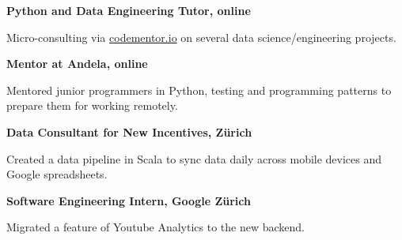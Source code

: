 \documentclass[10pt]{article} %
\begin{document}
\begin{minipage}[t]{0.5\textwidth}
{\raggedright\large \textbf{Python and Data Engineering Tutor, online}\\
}

\normalsize{Micro-consulting via \href{http://www.codementor.io/carolinux}{codementor.io} on several data science/engineering projects.}\\

{\raggedright\large \textbf{Mentor at Andela, online}\\
}

\normalsize{Mentored junior programmers in Python, testing and programming patterns to prepare them for working remotely.} 
\\

{\raggedright\large \textbf{Data Consultant for New Incentives, Z\"urich}\\
}

\normalsize{Created a data pipeline in Scala to sync data daily across mobile devices and Google spreadsheets.}\\

{\raggedright\large \textbf{Software Engineering Intern, Google Z\"urich}\\
}

\normalsize{Migrated a feature of Youtube Analytics to the new backend.}\\










	

\end{minipage} %
\end{document}
